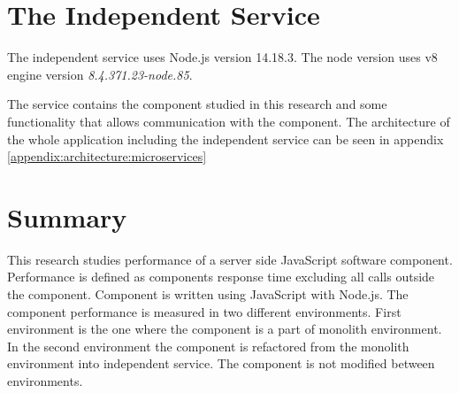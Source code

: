 \section{The Independent Service}
The independent service uses Node.js version 14.18.3.
The node version uses v8 engine version \textit{8.4.371.23-node.85}.

The service contains the component studied in this research and some functionality that allows communication with the component.
The architecture of the whole application including the independent service can be seen in appendix \ref{appendix:architecture:microservices}

\section{Summary}
This research studies performance of a server side JavaScript software component.
Performance is defined as components response time excluding all calls outside the component.
Component is written using JavaScript with Node.js.
The component performance is measured in two different environments.
First environment is the one where the component is a part of monolith environment.
In the second environment the component is refactored from the monolith environment into independent service.
The component is not modified between environments.
